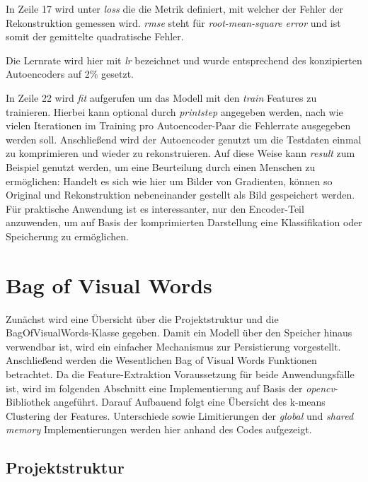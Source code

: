 In Zeile 17 wird unter \textit{loss} die die Metrik definiert, mit welcher der Fehler der Rekonstruktion gemessen wird. \textit{rmse} steht für \textit{root-mean-square error} und ist somit der gemittelte quadratische Fehler. 

Die Lernrate wird hier mit \textit{lr} bezeichnet und wurde entsprechend des konzipierten Autoencoders auf 2\% gesetzt.

In Zeile 22 wird \textit{fit} aufgerufen um das Modell mit den \textit{train} Features zu trainieren. Hierbei kann optional durch \textit{print\textunderscore step} angegeben werden, nach wie vielen Iterationen im Training pro Autoencoder-Paar die Fehlerrate ausgegeben werden soll.
Anschließend wird der Autoencoder genutzt um die Testdaten einmal zu komprimieren und wieder zu rekonstruieren. Auf diese Weise kann \textit{result} zum Beispiel genutzt werden, um eine Beurteilung durch einen Menschen zu ermöglichen: Handelt es sich wie hier um Bilder von Gradienten, können so Original und Rekonstruktion nebeneinander gestellt als Bild gespeichert werden. Für praktische Anwendung ist es interessanter, nur den Encoder-Teil anzuwenden, um auf Basis der komprimierten Darstellung eine Klassifikation oder Speicherung zu ermöglichen.  

\section{Bag of Visual Words}

Zunächst wird eine Übersicht über die Projektstruktur und die BagOfVisualWords-Klasse gegeben. Damit ein Modell über den Speicher hinaus verwendbar ist, wird ein einfacher Mechanismus zur Persistierung vorgestellt. Anschließend werden die Wesentlichen Bag of Visual Words Funktionen betrachtet. Da die Feature-Extraktion Voraussetzung für beide Anwendungsfälle ist, wird im folgenden Abschnitt eine Implementierung auf Basis der \textit{opencv}-Bibliothek angeführt. Darauf Aufbauend folgt eine Übersicht des k-means Clustering der Features. Unterschiede sowie Limitierungen der \textit{global} und \textit{shared memory} Implementierungen werden hier anhand des Codes aufgezeigt.

\subsection{Projektstruktur}

